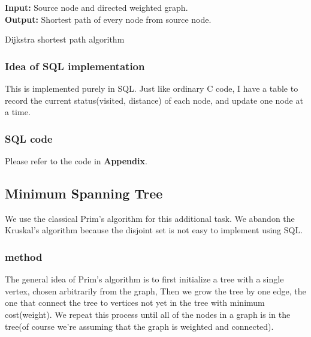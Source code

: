 \begin{algorithm}[!htbf]
{\bf Input:} Source node and directed weighted graph. \\
{\bf Output:} Shortest path of every node from source node. 
\begin{algorithmic}
\caption{Dijkstra shortest path algorithm}
\ENDFOR
{}
        \ENDIF
    \ENDFOR
\ENDWHILE
\end{algorithmic}
\label{algo:dijkstra}
\end{algorithm}

\subsubsection{Idea of SQL implementation}
This is implemented purely in SQL. Just like ordinary C code, I have a table to record the current status(visited, distance) of each node, and update one node at a time. 

\subsubsection{SQL code}
Please refer to the code in {\bf Appendix}.

\subsection{Minimum Spanning Tree}
We use the classical Prim's algorithm for this additional task. We abandon the Kruskal's algorithm because the disjoint set is not easy to implement using SQL.

\subsubsection{method}
The general idea of Prim's algorithm is to first initialize a tree with a single vertex, chosen arbitrarily from the graph, Then we grow the tree by one edge, the one that connect
the tree to vertices not yet in the tree with minimum cost(weight). We repeat this process until all of the nodes in a graph is in the tree(of course we're assuming that the graph is weighted and connected).

